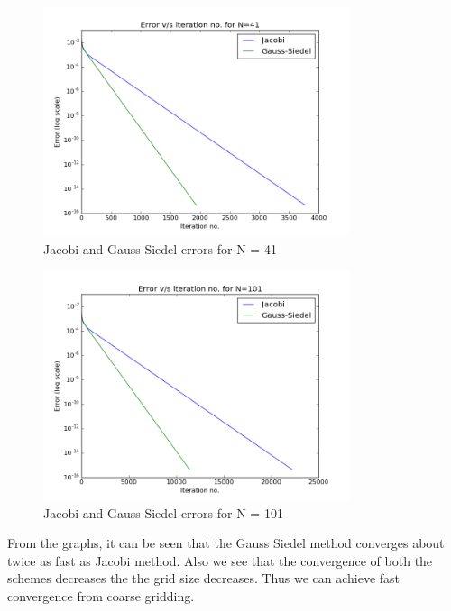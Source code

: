 \documentclass[11pt, a4paper]{article}
\begin{document}
\begin{figure}[H]
 \centering
 \includegraphics[width = 0.8\textwidth]{N_41.png}
 \caption{Jacobi and Gauss Siedel errors for N = 41}
\end{figure}

\begin{figure}[H]
 \centering
 \includegraphics[width = 0.8\textwidth]{N_101.png}
 \caption{Jacobi and Gauss Siedel errors for N = 101}
\end{figure}

From the graphs, it can be seen that the Gauss Siedel method converges about twice as fast as Jacobi method. Also we see that
the convergence of both the schemes decreases the the grid size decreases. Thus we can achieve fast convergence from coarse 
gridding.
\end{document}
